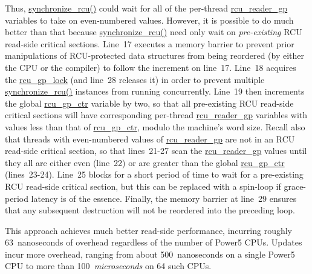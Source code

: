 Thus, \url{synchronize_rcu()} could wait for all of the per-thread
\url{rcu_reader_gp} variables to take on even-numbered values.
However, it is possible to do much better than that because
\url{synchronize_rcu()} need only wait on \emph{pre-existing}
RCU read-side critical sections.
Line~17 executes a memory barrier to prevent prior manipulations
of RCU-protected data structures from being reordered (by either
the CPU or the compiler) to follow the increment on line~17.
Line~18 acquires the \url{rcu_gp_lock} (and line~28 releases it)
in order to prevent multiple
\url{synchronize_rcu()} instances from running concurrently.
Line~19 then increments the global \url{rcu_gp_ctr} variable by
two, so that all pre-existing RCU read-side critical sections will
have corresponding per-thread \url{rcu_reader_gp} variables with
values less than that of \url{rcu_gp_ctr}, modulo the machine's
word size.
Recall also that threads with even-numbered values of \url{rcu_reader_gp}
are not in an RCU read-side critical section,
so that lines~21-27 scan the \url{rcu_reader_gp} values until they
all are either even (line~22) or are greater than the global
\url{rcu_gp_ctr} (lines~23-24).
Line~25 blocks for a short period of time to wait for a
pre-existing RCU read-side critical section, but this can be replaced with
a spin-loop if grace-period latency is of the essence.
Finally, the memory barrier at line~29 ensures that any subsequent
destruction will not be reordered into the preceding loop.

 \QuickQuizEnd

This approach achieves much better read-side performance, incurring
roughly 63~nanoseconds of overhead regardless of the number of
Power5 CPUs.
Updates incur more overhead, ranging from about 500~nanoseconds on
a single Power5 CPU to more than 100~\emph{microseconds} on 64
such CPUs.

 \QuickQuizEnd

